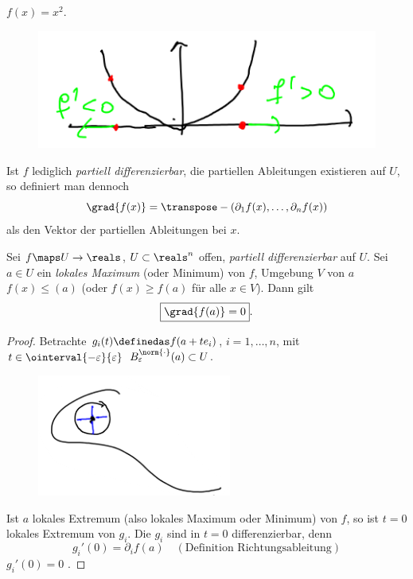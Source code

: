 \begin{beispiel*}
    \( f(x)=x^2 \).
    \begin{figure}[H]
        \centering
        \includegraphics[width=0.4\linewidth]{figures/gradient_beispiel_parabel_2d}
        \label{fig:gradient_beispiel_parabel_2d}
    \end{figure}
    Ist \( f \) lediglich \emph{partiell differenzierbar}, \dh  die partiellen Ableitungen existieren auf \( U \), so definiert man dennoch
    \begin{equation*}
        \grad{f(x)}=\transpose-{(\partial_1 f(x),\dotsc, \partial_n f(x))}
    \end{equation*}
    als den Vektor der partiellen Ableitungen bei \( x \).
\end{beispiel*}
\begin{satz}\label{extremum_notwendige_bedingung}
    Sei \( f\maps U\to \reals \), \( U\subset \reals^n \) offen, \emph{partiell differenzierbar} auf \( U \). Sei \( a\in U \) ein \emph{lokales Maximum} (oder Minimum) von \( f \), \dh  \texists Umgebung \( V \) von \( a \) \sd \( f(x)\leq (a) \) (oder \( f(x)\geq f(a) \) für alle \( x\in V \)). Dann gilt
    \begin{equation*}
        \boxed{\grad{f(a)}=0}.
    \end{equation*} 
\end{satz}
\begin{proof}
    Betrachte \( g_i(t)\definedas f(a+t e_i) \), \( i=1,\dotsc, n \), mit \( t\in \ointerval{-\varepsilon}{\varepsilon} \) \sd \( B_{\varepsilon}^{\norm{\cdot}}(a)\subset U \).
    \begin{figure}[H]
        \centering
        \includegraphics[width=0.5\linewidth]{figures/extrema_notwendige_bedingung_beweis_umgebung}
        \label{fig:extrema_notwendige_bedingung_beweis_umgebung}
    \end{figure}
    Ist \( a \) lokales Extremum (also lokales Maximum oder Minimum) von \( f\), so ist \( t=0 \) lokales Extremum von \( g_i \). Die \( g_i \) sind in \( t=0 \) differenzierbar, denn
    \begin{equation*}
        g_i'(0)=\partial_i f(a)\quad (\text{Definition Richtungsableitung})
    \end{equation*}
     \timplies \( g_i'(0)=0 \) \timplies \Beh.
\end{proof}
